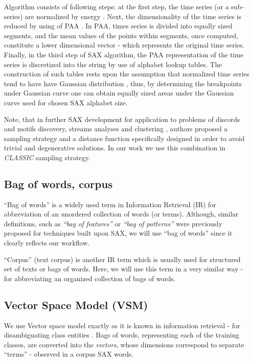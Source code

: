 \documentclass{llncs}
\begin{document}
Algorithm consists of following steps: at the first step, the time series (or a sub-series) are normalized
by energy \cite{goldin_kanellakis}. Next, the dimensionality of the time series is reduced by using 
of PAA \cite{paa}. In PAA, times series is divided into equally sized segments, and the mean values 
of the points within segments, once computed, constitute a lower dimensional vector - which 
represents the original time series. Finally, in the third step of SAX algorithm, the PAA representation 
of the time series is discretized into the string by use of alphabet lookup tables. The construction of 
such tables rests upon the assumption that normalized time series tend to have have Gaussian 
distribution \cite{larsen_marx}, thus, by determining the breakpoints under Gaussian curve one 
can obtain equally sized areas under the Gaussian curve used for chosen SAX alphabet size.

Note, that in further SAX development \cite{hot_sax} for application to problems of discords
and motifs discovery, streams analyses and clustering \cite{streaming_sax}, authors proposed a 
sampling strategy and a distance function specifically designed in order to avoid trivial and 
degenerative solutions. In our work we use this combination in \textit{CLASSIC} sampling strategy.

\subsection{Bag of words, corpus}
``Bag of words'' is a widely used term in Information Retrieval (IR) for abbreviation of an
unordered collection of words (or terms). Although, similar definitions, such as \textit{``bag of
features''} or \textit{``bag of patterns''} \cite{bag_patterns} were previously proposed for
techniques built upon SAX, we will use ``bag of words'' since it clearly reflects our
workflow. 

``Corpus'' (text corpus) is another IR term which is usually used for structured set of texts or
bags of words. Here, we will use this term in a very similar way - for abbreviating an organized
collection of bags of words. 

\subsection{Vector Space Model (VSM)}
We use Vector space model exactly as it is known in information retrieval - for disambiguating class
entities \cite{salton}. Bags of words, representing each of the training classes, are converted into
the \textit{vectors}, whose dimensions correspond to separate “terms” - observed in a corpus SAX
words. 
\end{document}

